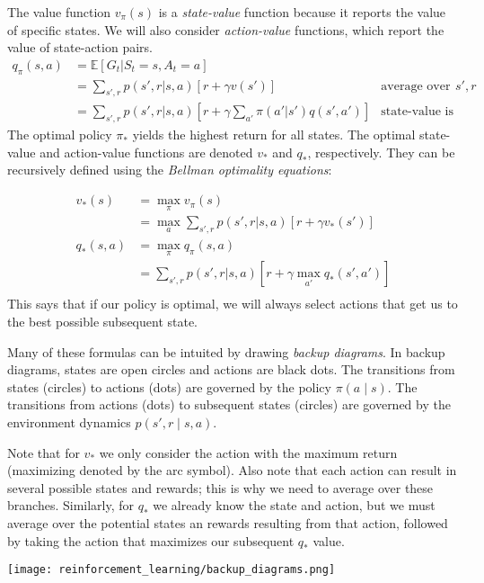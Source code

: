 The value function $v_\pi(s)$ is a \textit{state-value} function because it reports the value of specific states. We will also consider \textit{action-value} functions, which report the value of state-action pairs.
\begin{align*}
q_\pi(s,a) &= \mathbb{E}[G_t | S_t=s, A_t=a] \\
&= \sum_{s',r} p(s', r | s, a) [r + \gamma v(s')] & \scriptstyle{\text{average over potential $s',r$}} \\
&= \sum_{s',r} p(s', r | s, a) [r + \gamma \sum_{a'} \pi(a' | s') q(s', a')] & \scriptstyle{\text{state-value is average over action-values}}
\end{align*}
The optimal policy $\pi_*$ yields the highest return for all states. The optimal state-value and action-value functions are denoted $v_*$ and $q_*$, respectively. They can be recursively defined using the \textit{Bellman optimality equations}:


\begin{align*}
v_*(s) &= \max_\pi v_\pi(s) \\
&= \max_a \sum_{s', r} p(s',r | s,a) [r + \gamma v_*(s')] \\
q_*(s,a) &= \max_\pi q_\pi(s,a) \\
&= \sum_{s', r} p(s',r | s,a) [r + \gamma \max_{a'} q_*(s', a')] \\
\end{align*}
This says that if our policy is optimal, we will always select actions that get us to the best possible subsequent state.

Many of these formulas can be intuited by drawing \textit{backup diagrams}. In backup diagrams, states are open circles and actions are black dots. The transitions from states (circles) to actions (dots) are governed by the policy $\pi(a \mid s)$. The transitions from actions (dots) to subsequent states (circles) are governed by the environment dynamics $p(s',r \mid s,a)$.

Note that for $v_*$ we only consider the action with the maximum return (maximizing denoted by the arc symbol). Also note that each action can result in several possible states and rewards; this is why we need to average over these branches. Similarly, for $q_*$ we already know the state and action, but we must average over the potential states an rewards resulting from that action, followed by taking the action that maximizes our subsequent $q_*$ value.

\begin{center}\texttt{[image: reinforcement\_learning/backup\_diagrams.png]}\end{center}

